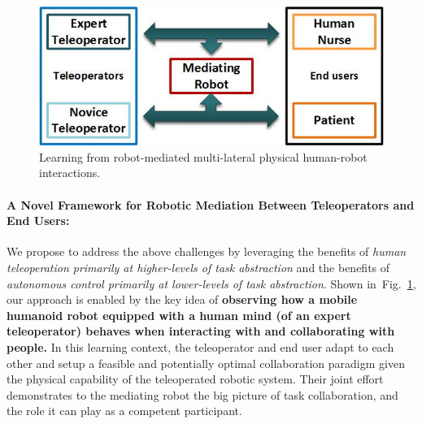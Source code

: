 \documentclass[letterpaper, 11 pt, onecolumn]{article}
\newcommand{\fig}[1]{Fig.~\ref{#1}}
\begin{document}

\begin{figure}
\centering
  \includegraphics[width=0.99\linewidth]{fig//001TeleNursing_Overview}
\caption{Learning from robot-mediated multi-lateral physical human-robot interactions.}
\label{001TeleNursing_Overview}
\end{figure}

\paragraph*{A Novel Framework for Robotic Mediation Between Teleoperators and End Users:} We propose to address the above challenges by leveraging the benefits of {\it human teleoperation primarily at higher-levels of task abstraction} and the benefits of {\it autonomous control primarily at lower-levels of task abstraction}. Shown in~\fig{001TeleNursing_Overview},  our approach is enabled by the key idea of {\bf observing how a mobile humanoid robot equipped with a human mind (of an expert teleoperator) behaves when interacting with and collaborating with people.} In this learning context, the teleoperator and end user adapt to each other and setup a feasible and potentially optimal collaboration paradigm given the physical capability of the teleoperated robotic system. Their joint effort demonstrates to the mediating robot the big picture of task collaboration, and the role it can play as a competent participant. 
\end{document}
